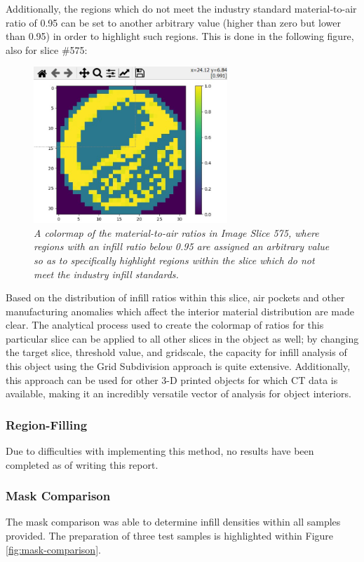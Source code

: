 \documentclass[11pt, letterpaper]{article}
\begin{document}
Additionally, the regions which do not meet the industry standard material-to-air ratio of 0.95 can be set to another arbitrary value (higher than zero but lower than 0.95) in order to highlight such regions.  This is done in the following figure, also for slice \#575:

\begin{figure}[H]
 \centering
 \includegraphics[width=0.65\textwidth]{images/underfill.png}
 \caption{\textit{A colormap of the material-to-air ratios in Image Slice 575, where regions with an infill ratio below 0.95 are assigned an arbitrary value so as to specifically highlight regions within the slice which do not meet the industry infill standards.}}
\end{figure}

Based on the distribution of infill ratios within this slice, air pockets and other manufacturing anomalies which affect the interior material distribution are made clear.  The analytical process used to create the colormap of ratios for this particular slice can be applied to all other slices in the object as well; by changing the target slice, threshold value, and gridscale,  the capacity for infill analysis of this object using the Grid Subdivision approach is quite extensive. Additionally, this approach can be used for other 3-D printed objects for which CT data is available, making it an incredibly versatile vector of analysis for object interiors.

\subsubsection{Region-Filling}
Due to difficulties with implementing this method, no results have been completed as of writing this report.

\subsubsection{Mask Comparison}
The mask comparison was able to determine infill densities within all samples provided. The preparation of three test samples is highlighted within Figure \ref{fig:mask-comparison}.
\end{document}
